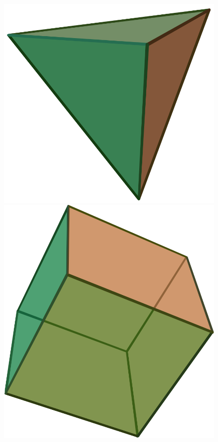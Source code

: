 \begin{multicols}{2}
\begin{figure}[H]
		\includegraphics[scale=0.07]{Tetrahedron.png} 
		\includegraphics[scale=0.07]{Hexahedron.png}

\end{figure}
\end{multicols}
